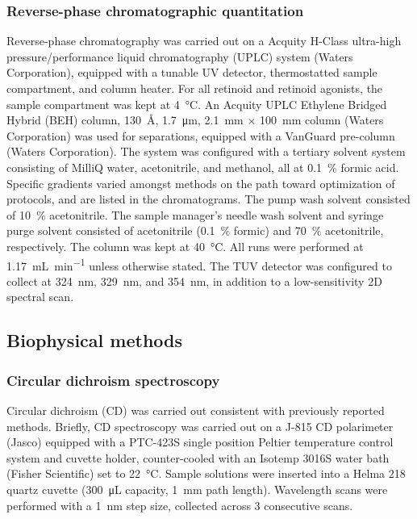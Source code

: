 \begin{refsection}
\subsubsection{Reverse-phase chromatographic quantitation}

Reverse-phase chromatography was carried out on a Acquity H-Class ultra-high
pressure/performance liquid chromatography (UPLC) system (Waters Corporation),
equipped with a tunable UV detector, thermostatted sample compartment, and
column heater. For all retinoid and retinoid agonists, the sample compartment
was kept at \SI{4}{\celsius}. An Acquity UPLC Ethylene Bridged Hybrid (BEH)  column,
\SI{130}{\angstrom}, \SI{1.7}{\um}, \SI{2.1}{\mm} ${\times}$ \SI{100}{\mm}
column (Waters Corporation) was used for separations, equipped with a VanGuard
 pre-column (Waters Corporation). The system was configured with a
tertiary solvent system consisting of MilliQ water, acetonitrile, and methanol,
all at \SI{0.1}{\percent} formic acid. Specific gradients varied amongst methods
on the path toward optimization of protocols, and are listed in the
chromatograms. The pump wash solvent consisted of \SI{10}{\percent}
acetonitrile. The sample manager's needle wash solvent and syringe purge solvent
consisted of acetonitrile (\SI{0.1}{\percent} formic) and \SI{70}{\percent}
acetonitrile, respectively. The column was kept at \SI{40}{\celsius}. All runs
were performed at \SI{1.17}{\mL\per\minute} unless otherwise stated. The TUV
detector was configured to collect at \SI{324}{\nm}, \SI{329}{\nm}, and
\SI{354}{\nm}, in addition to a low-sensitivity 2D spectral scan.

\subsection{Biophysical methods}

\subsubsection{Circular dichroism spectroscopy}

Circular dichroism (CD) was carried out consistent with previously reported
methods.\cite{Haghpanah2009,Gunasekar2009,Haghpanah2010,Yuvienco2012} Briefly,
CD spectroscopy was carried out on a J-815 CD polarimeter
(Jasco) equipped with a PTC-423S single position Peltier temperature control
system and cuvette holder, counter-cooled with an Isotemp 3016S water bath
(Fisher Scientific) set to \SI{22}{\celsius}. Sample solutions were inserted
into a Helma 218 quartz cuvette (\SI{300}{\uL} capacity, \SI{1}{\mm} path
length). Wavelength scans were performed with a \SI{1}{\nm} step size, collected
across 3 consecutive scans.


\end{refsection}
